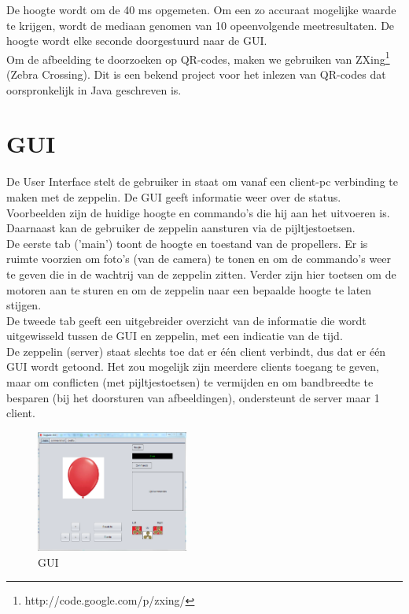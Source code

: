 \documentclass[tt]{penoverslag}
\begin{document}
De hoogte wordt om de 40 ms opgemeten. Om een zo accuraat mogelijke waarde te krijgen, wordt de mediaan genomen van 10 opeenvolgende meetresultaten. De hoogte wordt elke seconde doorgestuurd naar de GUI. \\

Om de afbeelding te doorzoeken op QR-codes, maken we gebruiken van ZXing\footnote{http://code.google.com/p/zxing/} (Zebra Crossing). Dit is een bekend project voor het inlezen van QR-codes dat oorspronkelijk in Java geschreven is. \\



\section{GUI}
De User Interface stelt de gebruiker in staat om vanaf een client-pc verbinding te maken met de zeppelin. De GUI geeft informatie weer over de status. Voorbeelden zijn de huidige hoogte en commando's die hij aan het uitvoeren is. Daarnaast kan de gebruiker de zeppelin aansturen via de pijltjestoetsen. \\

De eerste tab ('main') toont de hoogte en toestand van de propellers. Er is ruimte voorzien om foto's (van de camera) te tonen en om de commando's weer te geven die in de wachtrij van de zeppelin zitten. Verder zijn hier toetsen om de motoren aan te sturen en om de zeppelin naar een bepaalde hoogte te laten stijgen.\\

De tweede tab geeft een uitgebreider overzicht van de informatie die wordt uitgewisseld tussen de GUI en zeppelin, met een indicatie van de tijd. \\

De zeppelin (server) staat slechts toe dat er \'e\'en client verbindt, dus dat er \'e\'en GUI wordt getoond. Het zou mogelijk zijn meerdere clients toegang te geven, maar om conflicten (met pijltjestoetsen) te vermijden en om bandbreedte te besparen (bij het doorsturen van afbeeldingen), ondersteunt de server maar 1 client. \\

\begin{figure}[ht!]
\centering
\includegraphics[height=40mm]{GUI.png}
\caption{GUI}
\label{GUI}
\end{figure}
\end{document}
